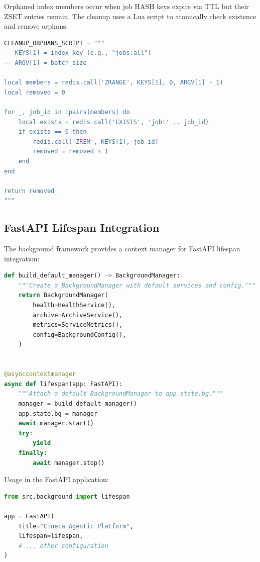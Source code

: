 Orphaned index members occur when job HASH keys expire via TTL but their ZSET entries remain. The cleanup uses a Lua script to atomically check existence and remove orphans:

\begin{lstlisting}[language=Python, caption={Orphan cleanup Lua script (conceptual).}]
CLEANUP_ORPHANS_SCRIPT = """
-- KEYS[1] = index key (e.g., "jobs:all")
-- ARGV[1] = batch_size

local members = redis.call('ZRANGE', KEYS[1], 0, ARGV[1] - 1)
local removed = 0

for _, job_id in ipairs(members) do
    local exists = redis.call('EXISTS', 'job:' .. job_id)
    if exists == 0 then
        redis.call('ZREM', KEYS[1], job_id)
        removed = removed + 1
    end
end

return removed
"""
\end{lstlisting}

\subsection{FastAPI Lifespan Integration}

The background framework provides a context manager for FastAPI lifespan integration:

\begin{lstlisting}[language=Python, caption={FastAPI lifespan integration.}]
def build_default_manager() -> BackgroundManager:
    """Create a BackgroundManager with default services and config."""
    return BackgroundManager(
        health=HealthService(),
        archive=ArchiveService(),
        metrics=ServiceMetrics(),
        config=BackgroundConfig(),
    )


@asynccontextmanager
async def lifespan(app: FastAPI):
    """Attach a default BackgroundManager to app.state.bg."""
    manager = build_default_manager()
    app.state.bg = manager
    await manager.start()
    try:
        yield
    finally:
        await manager.stop()
\end{lstlisting}

Usage in the FastAPI application:

\begin{lstlisting}[language=Python, caption={Lifespan usage in app.py.}]
from src.background import lifespan

app = FastAPI(
    title="Cineca Agentic Platform",
    lifespan=lifespan,
    # ... other configuration
)
\end{lstlisting}

